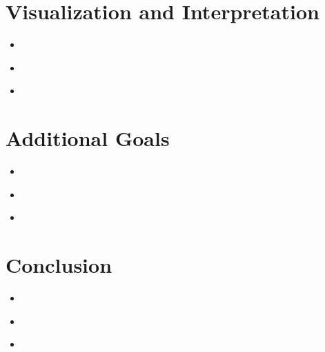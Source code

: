 \section{Visualization and Interpretation}
\medskip
\begin{itemize}
    For at least 5 hidden states give a list of the top 10 words that associate with this hidden state and
state any common features these groups.
What are some properties of the different hidden states?
e.g. Correlation between hidden states and syllable counts, connotations of words, etc.
Make a visual representation of the correlation between states and words

    \item {} \\

    \item {} \\

    \item {} \\

\end{itemize}


\section{Additional Goals}
\medskip
\begin{itemize}
    e.g. rhyme/meter

    \item {} \\

    \item {} \\

    \item {} \\

\end{itemize}



\section{Conclusion}
\medskip
\begin{itemize}
    How was the work divided up?
What are your conclusions/observations about the models you used and the sonnets generated?

    \item {} \\

    \item {} \\

    \item {} \\

\end{itemize}


